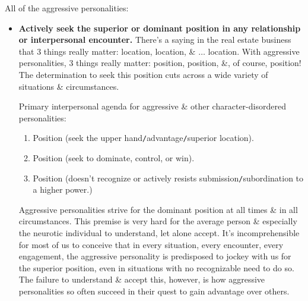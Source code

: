 \documentclass{article}
\numberwithin{equation}{section}
\begin{document}
All of the aggressive personalities:
\begin{itemize}
    \item \textbf{Actively seek the superior or dominant position in any relationship or interpersonal encounter.} There's a saying in the real estate business that 3 things really matter: location, location, \& $\ldots$ location. With aggressive personalities, 3 things really matter: position, position, \&, of course, position! The determination to seek this position cuts across a wide variety of situations \& circumstances.
    
    Primary interpersonal agenda for aggressive \& other character-disordered personalities:
    \begin{enumerate}
        \item Position (seek the upper hand\texttt{/}advantage\texttt{/}superior location).
        \item Position (seek to dominate, control, or win).
        \item Position (doesn't recognize or actively resists submission\texttt{/}subordination to a higher power.)
    \end{enumerate}
    Aggressive personalities strive for the dominant position at all times \& in all circumstances. This premise is very hard for the average person \& especially the neurotic individual to understand, let alone accept. It's incomprehensible for most of us to conceive that in every situation, every encounter, every engagement, the aggressive personality is predisposed to jockey with us for the superior position, even in situations with no recognizable need to do so. The failure to understand \& accept this, however, is how aggressive personalities so often succeed in their quest to gain advantage over others.
    

\end{itemize}
\end{document}
